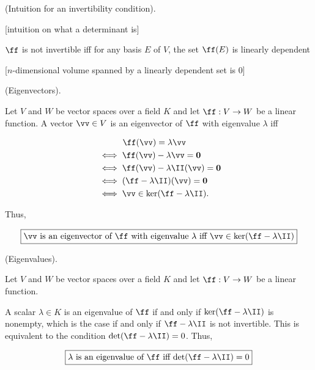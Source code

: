 \begin{theorem}
    (Intuition for an invertibility condition).
    
    [intuition on what a determinant is]
    
    $\ff$ is not invertible iff for any basis $E$ of $V$, the set $\ff(E)$ is linearly dependent

    [$n$-dimensional volume spanned by a linearly dependent set is $0$]
\end{theorem}

\begin{deriv}
    (Eigenvectors).

     Let $V$ and $W$ be vector spaces over a field $K$ and let $\ff:V \rightarrow W$ be a linear function. A vector $\vv \in V$ is an eigenvector of $\ff$ with eigenvalue $\lambda$ iff

    \begin{align*}
        &\quad \quad \quad \ff(\vv) = \lambda \vv \\
        &\iff \ff(\vv) - \lambda \vv = \mathbf{0} \\
        &\iff \ff(\vv) - \lambda \II(\vv) = \mathbf{0} \\
        &\iff (\ff - \lambda \II)(\vv) = \mathbf{0} \\
        &\iff \vv \in \ker(\ff - \lambda \II).
    \end{align*}

    Thus,

    \begin{align*}
        \boxed
        {
            \text{$\vv$ is an eigenvector of $\ff$ with eigenvalue $\lambda$ iff $\vv \in \ker(\ff - \lambda \II)$}
        }
    \end{align*}
\end{deriv}

\begin{deriv}
    (Eigenvalues).

    Let $V$ and $W$ be vector spaces over a field $K$ and let $\ff:V \rightarrow W$ be a linear function.
    
    A scalar $\lambda \in K$ is an eigenvalue of $\ff$ if and only if $\ker(\ff - \lambda \II)$ is nonempty, which is the case if and only if $\ff - \lambda \II$ is not invertible. This is equivalent to the condition $\det(\ff - \lambda \II) = 0$. Thus,

    \begin{align*}
        \boxed
        {
            \text{$\lambda$ is an eigenvalue of $\ff$ iff $\det(\ff - \lambda \II) = 0$}
        }
    \end{align*}
\end{deriv}
